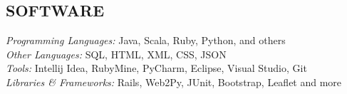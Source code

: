 \documentclass[margin]{res}
\begin{document}
\begin{resume}
\section{SOFTWARE} 
  {\sl Programming Languages:} Java, Scala, Ruby, Python, and others \\
  {\sl Other Languages:} SQL, HTML, XML, CSS, JSON \\ 
  {\sl Tools:} Intellij Idea, RubyMine, PyCharm, Eclipse, Visual Studio, Git \\
  {\sl Libraries \& Frameworks:} Rails, Web2Py, JUnit, Bootstrap, Leaflet and more 
            
\end{resume}
\end{document}
